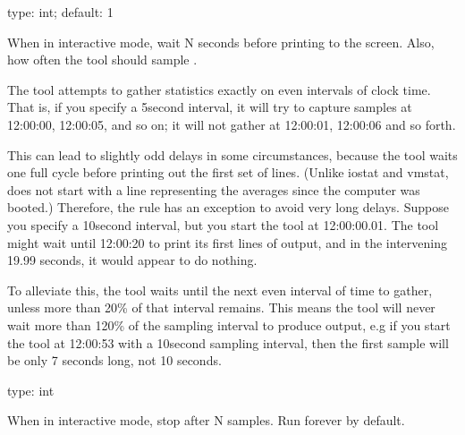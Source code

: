 \documentclass[letterpaper,10pt,english]{sphinxmanual}
\begin{document}
\begin{fulllineitems}
\label{\detokenize{mariadb-iostat:cmdoption-mariadb-iostat-interval}}
type: int; default: 1

When in interactive mode, wait N seconds before printing to the screen.
Also, how often the tool should sample .

The tool attempts to gather statistics exactly on even intervals of clock time.
That is, if you specify a 5\sphinxhyphen{}second interval, it will try to capture samples at
12:00:00, 12:00:05, and so on; it will not gather at 12:00:01, 12:00:06 and so
forth.

This can lead to slightly odd delays in some circumstances, because the tool
waits one full cycle before printing out the first set of lines. (Unlike iostat
and vmstat,  does not start with a line representing the averages
since the computer was booted.)  Therefore, the rule has an exception to avoid
very long delays.  Suppose you specify a 10\sphinxhyphen{}second interval, but you start the
tool at 12:00:00.01.  The tool might wait until 12:00:20 to print its first
lines of output, and in the intervening 19.99 seconds, it would appear to do
nothing.

To alleviate this, the tool waits until the next even interval of time to
gather, unless more than 20\% of that interval remains.  This means the tool will
never wait more than 120\% of the sampling interval to produce output, e.g if you
start the tool at 12:00:53 with a 10\sphinxhyphen{}second sampling interval, then the first
sample will be only 7 seconds long, not 10 seconds.

\end{fulllineitems}


\begin{fulllineitems}
\label{\detokenize{mariadb-iostat:cmdoption-mariadb-iostat-iterations}}
type: int

When in interactive mode, stop after N samples.  Run forever by default.

\end{fulllineitems}
\end{document}
